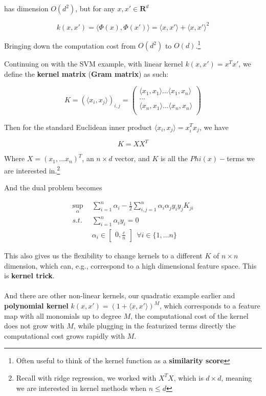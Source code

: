 \documentclass{article}
\DeclareMathOperator*{\msup}{sup}
\begin{document}
has dimension $O(d^2)$, but for any $x, x' \in \mathbf{R}^d$

$$
k(x, x') = \langle \Phi(x), \Phi(x') \rangle = \langle x, x' \rangle + \langle x, x' \rangle^2
$$

Bringing down the computation cost from $O(d^2)$ to $O(d)$.\footnote{Often useful to think of the kernel function as a \textbf{similarity score}}

Continuing on with the SVM example, with linear kernel $k(x, x') = x^T x'$, we define the \textbf{kernel matrix} (\textbf{Gram matrix}) as such:

$$
K = (\langle x_i, x_j \rangle)_{i, j} =
\begin{pmatrix}
\langle x_1, x_1 \rangle \dots \langle x_1, x_n \rangle \\
\dots \\
\langle x_n, x_1 \rangle \dots \langle x_n, x_n \rangle \\
\end{pmatrix}
$$

Then for the standard Euclidean inner product $\langle x_i, x_j \rangle = x_i^T x_j$, we have

$$
K = X X^T
$$

Where $X = (x_1, \dots x_n)^T$, an $n \times d$ vector, and $K$ is all the $Phi(x)-$terms we are interested in.\footnote{Recall with ridge regression, we worked with $X^T X$, which is $d \times d$, meaning we are interested in kernel methods when $n \leq d$}

And the dual problem becomes

\begin{align*}
\msup_{\alpha} ~ ~ & \sum_{i = 1}^{n}{\alpha_i} - \frac{1}{2} \sum_{i,j = 1}^{n}{\alpha_i \alpha_j y_i y_j K_{ji}} \\
s.t.               & \sum_{i = 1}^{n}{\alpha_i y_i} = 0 \\
                   & \alpha_i \in \begin{bmatrix}0, \frac{c}{n}\end{bmatrix} ~ ~ \forall i \in \{1, \dots n\}
\end{align*}

This also gives us the flexibility to change kernels to a different $K$ of $n \times n$ dimension, which can, e.g., correspond to a high dimensional feature space.
This is \textbf{kernel trick}.
\\
\\
And there are other non-linear kernels, our quadratic example earlier and \textbf{polynomial kernel} $k(x, x') = (1 + \langle x, x' \rangle)^M$, which corresponds to a feature map with all monomials up to degree $M$, the computational cost of the kernel does not grow with $M$, while plugging in the featurized terms directly the computational cost grows rapidly with $M$.
\end{document}
